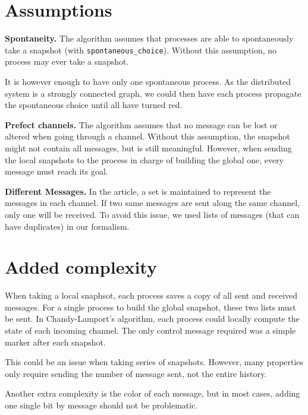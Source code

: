 \documentclass{article}
\begin{document}
\section{Assumptions}

\textbf{Spontaneity.} The algorithm assumes that processes are able to spontaneously take a snapshot (with \lstinline{spontaneous_choice}). Without this assumption, no process may ever take a snapshot.

It is however enough to have only one spontaneous process. As the distributed system is a strongly connected graph, we could then have each process propagate the spontaneous choice until all have turned red.

\textbf{Prefect channels.} The algorithm assumes that no message can be lost or altered when going through a channel.
Without this assumption, the snapshot might not contain all messages, but is still meaningful.
However, when sending the local snapshots to the process in charge of building the global one, every message must reach its goal.

\textbf{Different Messages.} In the article, a set is maintained to represent the messages in each channel.
If two same messages are sent along the same channel, only one will be received. To avoid this issue, we used lists of messages (that can have duplicates) in our formalism.

\section{Added complexity}

When taking a local snaphsot, each process saves a copy of all sent and received messages.
For a single process to build the global snapshot, these two lists must be sent.
In Chandy-Lamport's algorithm, each process could locally compute the state of each incoming channel. The only control message required was a simple marker after each snapshot.

This could be an issue when taking series of snapshots. However, many properties only require sending the number of message sent, not the entire history.

Another extra complexity is the color of each message, but in most cases, adding one single bit by message should not be problematic.
\end{document}
